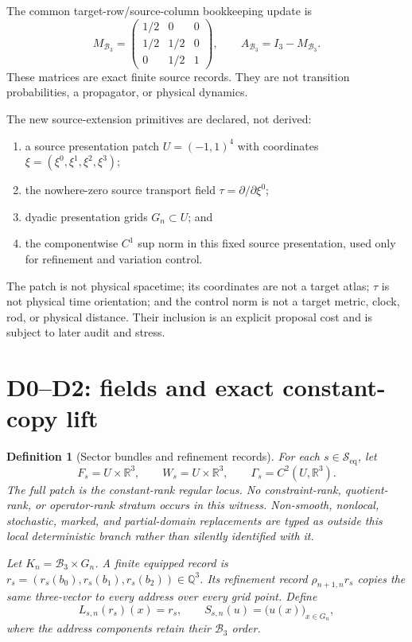 \documentclass[11pt]{article}
\newtheorem{definition}{Definition}
\newcommand{\Sectors}{\mathcal S_{\mathrm{eq}}}
\newcommand{\Bthree}{\mathcal B_3}
\newcommand{\RR}{\mathbb R}
\newcommand{\QQ}{\mathbb Q}
\begin{document}
The common target-row/source-column bookkeeping update is
\begin{equation}
 M_{\Bthree}=
 \begin{pmatrix}
  1/2&0&0\\
  1/2&1/2&0\\
  0&1/2&1
 \end{pmatrix},
 \qquad
 A_{\Bthree}=I_3-M_{\Bthree}.
 \label{eq:carrier}
\end{equation}
These matrices are exact finite source records. They are not transition
probabilities, a propagator, or physical dynamics.

The new source-extension primitives are declared, not derived:
\begin{enumerate}[leftmargin=*]
\item a source presentation patch \(U=(-1,1)^4\) with coordinates
  \(\xi=(\xi^0,\xi^1,\xi^2,\xi^3)\);
\item the nowhere-zero source transport field
  \(\tau=\partial/\partial\xi^0\);
\item dyadic presentation grids \(G_n\subset U\); and
\item the componentwise \(C^1\) sup norm in this fixed source presentation,
  used only for refinement and variation control.
\end{enumerate}
The patch is not physical spacetime; its coordinates are not a target atlas;
\(\tau\) is not physical time orientation; and the control norm is not a
target metric, clock, rod, or physical distance. Their inclusion is an
explicit proposal cost and is subject to later audit and stress.

\section{D0--D2: fields and exact constant-copy lift}

\begin{definition}[Sector bundles and refinement records]
For each \(s\in\Sectors\), let
\[
  F_s=U\times\RR^3,\qquad
  W_s=U\times\RR^3,\qquad
  \Gamma_s=C^2(U,\RR^3).
\]
The full patch is the constant-rank regular locus. No constraint-rank,
quotient-rank, or operator-rank stratum occurs in this witness.
Non-smooth, nonlocal, stochastic, marked, and partial-domain replacements are
typed as outside this local deterministic branch rather than silently
identified with it.

Let \(K_n=\Bthree\times G_n\). A finite equipped record is
\(r_s=(r_s(b_0),r_s(b_1),r_s(b_2))\in\QQ^3\). Its refinement record
\(\rho_{n+1,n}r_s\) copies the same three-vector to every address over every
grid point. Define
\[
 L_{s,n}(r_s)(x)=r_s,\qquad
 S_{s,n}(u)=\bigl(u(x)\bigr)_{x\in G_n},
 \]
where the address components retain their \(\Bthree\) order.
\end{definition}
\end{document}
